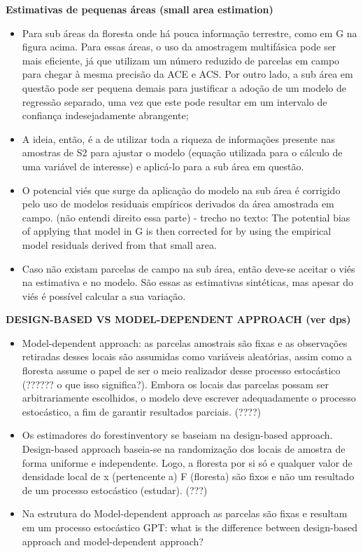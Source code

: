 \documentclass[
]{article}
\begin{document}
\textbf{Estimativas de pequenas áreas (small area estimation)}

\begin{itemize}
\item
  Para sub áreas da floresta onde há pouca informação terrestre, como em
  G na figura acima. Para essas áreas, o uso da amostragem multifásica
  pode ser mais eficiente, já que utilizam um número reduzido de
  parcelas em campo para chegar à mesma precisão da ACE e ACS. Por outro
  lado, a sub área em questão pode ser pequena demais para justificar a
  adoção de um modelo de regressão separado, uma vez que este pode
  resultar em um intervalo de confiança indesejadamente abrangente;
\item
  A ideia, então, é a de utilizar toda a riqueza de informações presente
  nas amostras de S2 para ajustar o modelo (equação utilizada para o
  cálculo de uma variável de interesse) e aplicá-lo para a sub área em
  questão.
\item
  O potencial viés que surge da aplicação do modelo na sub área é
  corrigido pelo uso de modelos residuais empíricos derivados da área
  amostrada em campo. (não entendi direito essa parte) - trecho no
  texto: The potential bias of applying that model in G is then
  corrected for by using the empirical model residuals derived from that
  small area.
\item
  Caso não existam parcelas de campo na sub área, então deve-se aceitar
  o viés na estimativa e no modelo. São essas as estimativas sintéticas,
  mas apesar do viés é possível calcular a sua variação.
\end{itemize}

\textbf{DESIGN-BASED VS MODEL-DEPENDENT APPROACH (ver dps)}

\begin{itemize}
\item
  Model-dependent approach: as parcelas amostrais são fixas e as
  observações retiradas desses locais são assumidas como variáveis
  aleatórias, assim como a floresta assume o papel de ser o meio
  realizador desse processo estocástico (?????? o que isso significa?).
  Embora os locais das parcelas possam ser arbitrariamente escolhidos, o
  modelo deve escrever adequadamente o processo estocástico, a fim de
  garantir resultados parciais. (????)
\item
  Os estimadores do forestinventory se baseiam na design-based approach.
  Design-based approach baseia-se na randomização dos locais de amostra
  de forma uniforme e independente. Logo, a floresta por si só e
  qualquer valor de densidade local de x (pertencente a) F (floresta)
  são fixos e não um resultado de um processo estocástico (estudar).
  (???)
\item
  Na estrutura do Model-dependent approach as parcelas são fixas e
  resultam em um processo estocástico GPT: what is the difference
  between design-based approach and model-dependent approach?
\end{itemize}
\end{document}

